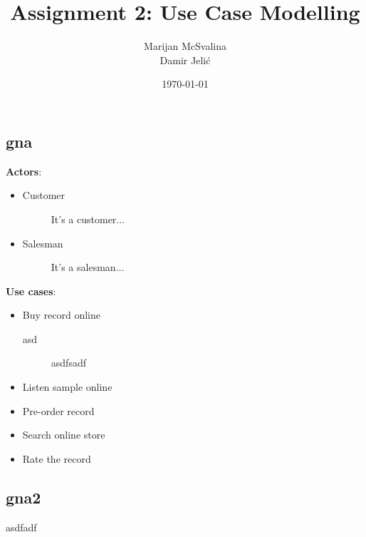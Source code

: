 \documentclass[12pt, titlepage]{article}
\title{Assignment 2: Use Case Modelling}
\date{\today}
\author{Marijan McSvalina \\ Damir Jelić}
\begin{document}
\maketitle 

\setcounter{section}{2}
\subsection{gna}
{\bf Actors}:
\begin{itemize}
\item
    Customer
    \begin{description}
    \item[] It's a customer...
    \end{description}
\item
    Salesman
    \begin{description}
    \item[] It's a salesman...
    \end{description}
\end{itemize}
{\bf Use cases}:
\begin{itemize}
\item
    Buy record online
    \begin{description}
    \item[asd]
    asdfsadf
    \end{description}
\item
    Listen sample online
\item
    Pre-order record
\item 
    Search online store
\item 
    Rate the record
\end{itemize}
\subsection{gna2}
asdfadf
\end{document}
